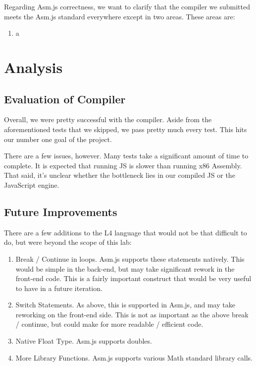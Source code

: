 \documentclass[twoside]{article}
\begin{document}
\begin{multicols}{2}
Regarding Asm.js correctness, we want to clarify that the compiler we submitted
meets the Asm.js standard everywhere except in two areas. These areas are:

\begin{enumerate}
  \item a
\end{enumerate}



\section{Analysis}

\subsection{Evaluation of Compiler}

Overall, we were pretty successful with the compiler. Aside from the aforementioned
tests that we skipped, we pass pretty much every test. This hits our number one
goal of the project.

There are a few issues, however. Many tests take a significant amount of time to
complete. It is expected that running JS is slower than running x86 Assembly.
That said, it's unclear whether the bottleneck lies in our compiled JS or the
JavaScript engine.

\subsection{Future Improvements}

There are a few additions to the L4 language that would not be that difficult
to do, but were beyond the scope of this lab:

\begin{enumerate}
  \item Break / Continue in loops. Asm.js supports these statements natively.
    This would be simple in the back-end, but may take significant rework in the
    front-end code. This is a fairly important construct that would be very useful
    to have in a future iteration.
  \item Switch Statements. As above, this is supported in Asm.js, and may take
    reworking on the front-end side. This is not as important as the above break
    / continue, but could make for more readable / efficient code.
  \item Native Float Type. Asm.js supports doubles.
  \item More Library Functions. Asm.js supports various Math standard library
    calls.
\end{enumerate}


\end{multicols}
\end{document}
